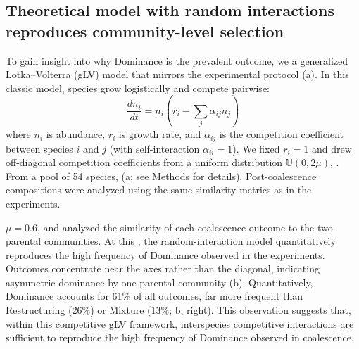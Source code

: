 \subsection{Theoretical model with random interactions reproduces community-level selection}
\label{sec:results:glv_model}
To gain insight into why Dominance is the prevalent outcome, we  a generalized Lotka--Volterra (gLV) model \citep{May1972, Grilli2017} that mirrors the experimental protocol (a). In this classic model, species grow logistically and compete pairwise:
\begin{equation}
\frac{dn_i}{dt} = n_i \left( r_i - \sum_j \alpha_{ij} n_j \right)
\label{eq:glv}
\end{equation}
where $n_i$ is abundance, $r_i$ is growth rate, and $\alpha_{ij}$ is the competition coefficient between species $i$ and $j$ (with self-interaction $\alpha_{ii} = 1$). We fixed $r_i = 1$ and drew off-diagonal competition coefficients from a uniform distribution $\mathbb{U}(0, 2\mu)$,  \citep{Hu2022,Hu2025}. From a pool of 54 species,  (a; see Methods for details). Post-coalescence compositions were analyzed using the same similarity metrics as in the experiments. 

  $\mu = 0.6$,  and analyzed the similarity of each coalescence outcome to the two parental communities. At this , the random-interaction model quantitatively reproduces the high frequency of Dominance observed in the experiments. Outcomes concentrate near the axes rather than the diagonal, indicating asymmetric dominance by one parental community (b). Quantitatively, Dominance accounts for 61\% of all outcomes, far more frequent than Restructuring (26\%) or Mixture (13\%; b, right). This observation suggests that, within this competitive gLV framework, interspecies competitive interactions are sufficient to reproduce the high frequency of Dominance observed in coalescence.


